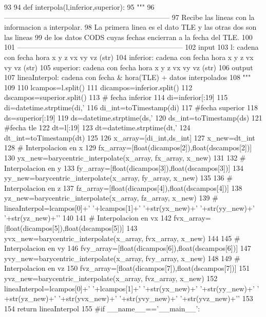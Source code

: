 \begin{DoxyCode}
93 
94 def interpola(l,inferior,superior):
95     """
96     ---------------------------------------------------------------------
97     Recibe las lineas con la informacion a interpolar.
98     La primera linea es el dato TLE y las otras dos son las lineas
99     de los datos CODS cuyas fechas encierran a la fecha del TLE.
100 
101     ---------------------------------------------------------------------
102     input
103         l: cadena con fecha hora x y z vx vy vz (str)
104         inferior: cadena con fecha hora x y z vx vy vz (str)
105         superior: cadena con fecha hora x y z vx vy vz (str)
106     output
107         lineaInterpol: cadena con fecha & hora(TLE) + datos interpolados 
108     """
109 
110     lcampos=l.split()
111     dicampos=inferior.split()
112     dscampos=superior.split()
113     # fecha inferior
114     di=inferior[:19]
115     di=datetime.strptime(di,'%
116     di_int=toTimestamp(di)
117     #fecha superior
118     ds=superior[:19]
119     ds=datetime.strptime(ds,'%
120     ds_int=toTimestamp(ds)
121     #fecha tle
122     dt=l[:19]
123     dt=datetime.strptime(dt,'%
124     dt_int=toTimestamp(dt)
125     
126     x_array=[di_int,ds_int]
127     x_new=dt_int
128     # Interpolacion en x
129     fx_array=[float(dicampos[2]),float(dscampos[2])]
130     yx_new=barycentric_interpolate(x_array, fx_array, x_new)
131 
132     # Interpolacion en y
133     fy_array=[float(dicampos[3]),float(dscampos[3])]
134     yy_new=barycentric_interpolate(x_array, fy_array, x_new)
135     
136     # Interpolacion en z
137     fz_array=[float(dicampos[4]),float(dscampos[4])]
138     yz_new=barycentric_interpolate(x_array, fz_array, x_new)
139 #    lineaInterpol=lcampos[0]+' '+lcampos[1]+' '+str(yx_new)+' '+str(yy_new)+'
       '+str(yz_new)+'\n'
140     
141     # Interpolacion en vx
142     fvx_array=[float(dicampos[5]),float(dscampos[5])]
143     yvx_new=barycentric_interpolate(x_array, fvx_array, x_new)
144  
145     # Interpolacion en vy
146     fvy_array=[float(dicampos[6]),float(dscampos[6])]
147     yvy_new=barycentric_interpolate(x_array, fvy_array, x_new)
148      
149     # Interpolacion en vz
150     fvz_array=[float(dicampos[7]),float(dscampos[7])]
151     yvz_new=barycentric_interpolate(x_array, fvz_array, x_new)
152     lineaInterpol=lcampos[0]+' '+lcampos[1]+' '+str(yx_new)+' '+str(yy_new)+' '
      +str(yz_new)+' '+str(yvx_new)+' '+str(yvy_new)+' '+str(yvz_new)+'\n'
153     
154     return lineaInterpol
155  
#if __name__=='__main__':   
\end{DoxyCode}


